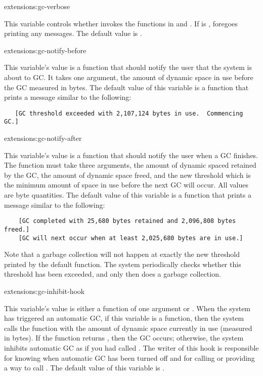 \begin{defvar}{extensions:}{gc-verbose}
  
  This variable controls whether  invokes the functions
  in  and
  .  If  is \nil,
   foregoes printing any messages.  The default value is
  .
\end{defvar}

\begin{defvar}{extensions:}{gc-notify-before}
  
  This variable's value is a function that should notify the user that
  the system is about to GC.  It takes one argument, the amount of
  dynamic space in use before the GC measured in bytes.  The default
  value of this variable is a function that prints a message similar
  to the following:
\begin{verbatim}
   [GC threshold exceeded with 2,107,124 bytes in use.  Commencing GC.]
\end{verbatim}
\end{defvar}

\begin{defvar}{extensions:}{gc-notify-after}
  
  This variable's value is a function that should notify the user when
  a GC finishes.  The function must take three arguments, the amount
  of dynamic spaced retained by the GC, the amount of dynamic space
  freed, and the new threshold which is the minimum amount of space in
  use before the next GC will occur.  All values are byte quantities.
  The default value of this variable is a function that prints a
  message similar to the following:
  \begin{verbatim}
    [GC completed with 25,680 bytes retained and 2,096,808 bytes freed.]
    [GC will next occur when at least 2,025,680 bytes are in use.]
  \end{verbatim}
\end{defvar}

Note that a garbage collection will not happen at exactly the new
threshold printed by the default 
function.  The system periodically checks whether this threshold has
been exceeded, and only then does a garbage collection.

\begin{defvar}{extensions:}{gc-inhibit-hook}
  
  This variable's value is either a function of one argument or \nil.
  When the system has triggered an automatic GC, if this variable is a
  function, then the system calls the function with the amount of
  dynamic space currently in use (measured in bytes).  If the function
  returns \nil, then the GC occurs; otherwise, the system inhibits
  automatic GC as if you had called .  The writer of
  this hook is responsible for knowing when automatic GC has been
  turned off and for calling or providing a way to call
  .  The default value of this variable is \nil.
\end{defvar}

